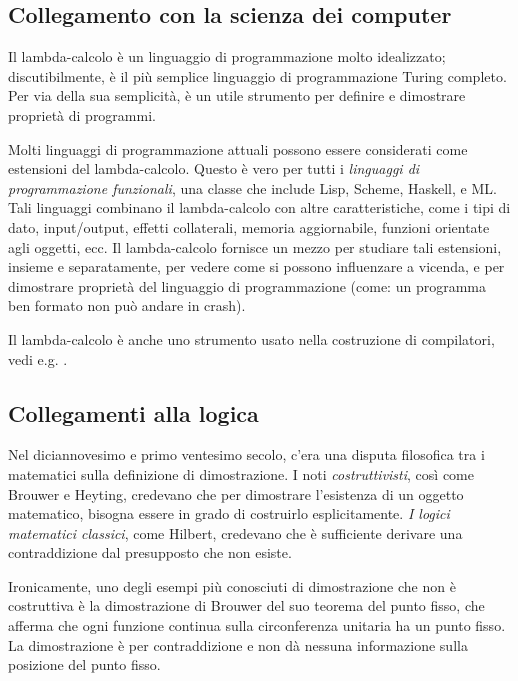 \documentclass{article}
\begin{document}
\subsection{Collegamento con la scienza dei computer}

Il lambda-calcolo \`e un linguaggio di programmazione molto idealizzato;
discutibilmente, \`e il pi\`u semplice linguaggio di programmazione
Turing completo. Per via della sua semplicit\`a, \`e un utile strumento per
definire e dimostrare propriet\`a di programmi.

Molti linguaggi di programmazione attuali possono essere considerati come
estensioni del lambda-calcolo. Questo \`e vero per tutti i 
{\em linguaggi di programmazione funzionali}, una classe che include 
Lisp, Scheme, Haskell, e ML. Tali linguaggi combinano il lambda-calcolo 
con altre caratteristiche, come i tipi di dato, input/output, effetti 
collaterali, memoria aggiornabile, funzioni orientate agli oggetti, ecc. 
Il lambda-calcolo fornisce un mezzo per studiare tali estensioni, 
insieme e separatamente, per vedere come si possono influenzare a vicenda, 
e per dimostrare propriet\`a del linguaggio di programmazione 
(come: un programma ben formato non pu\`o andare in crash).

Il lambda-calcolo \`e anche uno strumento usato nella costruzione di compilatori, vedi
e.g. \cite{Pey87,App92}.

\subsection{Collegamenti alla logica}

Nel diciannovesimo e primo ventesimo secolo, c'era una disputa
filosofica tra i matematici sulla definizione di dimostrazione. I noti
{\em costruttivisti}, cos\`i come Brouwer e Heyting, credevano che per dimostrare
l'esistenza di un oggetto matematico, bisogna essere in grado di costruirlo
esplicitamente. {\em I logici matematici classici}, come Hilbert, credevano che
\`e sufficiente derivare una contraddizione dal presupposto che non esiste.

Ironicamente, uno degli esempi pi\`u conosciuti di dimostrazione che
non \`e costruttiva \`e la dimostrazione di Brouwer del suo teorema del punto fisso,
che afferma che ogni funzione continua sulla circonferenza unitaria ha
un punto fisso. La dimostrazione \`e per contraddizione e non d\`a 
nessuna informazione sulla posizione del punto fisso.
\end{document}
